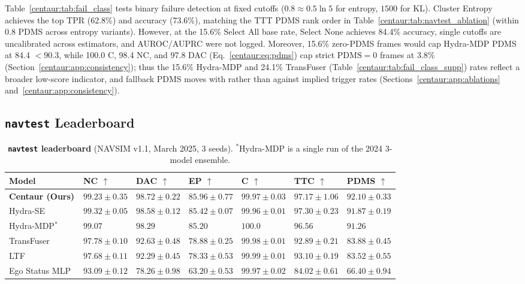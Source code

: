 Table~\ref{centaur:tab:fail_class} tests binary failure detection at fixed cutoffs ($0.8 \approx 0.5\ln 5$ for entropy, $1500$ for KL). Cluster Entropy achieves the top TPR (62.8\%) and accuracy (73.6\%), matching the TTT PDMS rank order in Table~\ref{centaur:tab:navtest_ablation} (within 0.8 PDMS across entropy variants). However, at the 15.6\% Select All base rate, Select None achieves 84.4\% accuracy, single cutoffs are uncalibrated across estimators, and AUROC/AUPRC were not logged. Moreover, 15.6\% zero-PDMS frames would cap Hydra-MDP PDMS at 84.4 $< 90.3$, while 100.0 C, 98.4 NC, and 97.8 DAC (Eq.~\eqref{centaur:eq:pdms}) cap strict $\text{PDMS}=0$ frames at 3.8\% (Section~\ref{centaur:app:consistency}); thus the 15.6\% Hydra-MDP and 24.1\% TransFuser (Table~\ref{centaur:tab:fail_class_supp}) rates reflect a broader low-score indicator, and fallback PDMS moves with rather than against implied trigger rates (Sections~\ref{centaur:app:ablations} and~\ref{centaur:app:consistency}).

\subsection{\texorpdfstring{\texttt{navtest}}{navtest} Leaderboard}\label{centaur:sec:leaderboard}

\begin{table}[t]
  \centering
  \caption[\texttt{navtest} leaderboard]{\textbf{\texttt{navtest} leaderboard} (NAVSIM v1.1, March 2025, 3 seeds). $^{\ast}$Hydra-MDP is a single run of the 2024 3-model ensemble.}
  \label{centaur:tab:navtest_all}
  \begin{adjustbox}{max width=\textwidth}
  \begin{tabular}{l|llll|ll}
    \toprule
    \textbf{Model} & \textbf{NC} $\uparrow$ & \textbf{DAC} $\uparrow$ & \textbf{EP} $\uparrow$ & \textbf{C} $\uparrow$ & \textbf{TTC} $\uparrow$ & \textbf{PDMS} $\uparrow$ \\
    \midrule
    \textbf{Centaur (Ours)} & $99.23\pm0.35$ & $\mathbf{98.72\pm0.22}$ & $\mathbf{85.96\pm0.77}$ & $99.97\pm0.03$ & $97.17\pm1.06$ & $\mathbf{92.10\pm0.33}$ \\
    Hydra-SE & $\mathbf{99.32\pm0.05}$ & $98.58\pm0.12$ & $85.42\pm0.07$ & $99.96\pm0.01$ & $\mathbf{97.30\pm0.23}$ & $91.87\pm0.19$ \\
    \midrule
    Hydra-MDP$^{\ast}$~\cite{li2024hydramdp} & $99.07$ & $98.29$ & $85.20$ & $\mathbf{100.0}$ & $96.56$ & $91.26$ \\
    TransFuser~\cite{chitta2023transfuser} & $97.78\pm0.10$ & $92.63\pm0.48$ & $78.88\pm0.25$ & $99.98\pm0.01$ & $92.89\pm0.21$ & $83.88\pm0.45$ \\
    LTF~\cite{chitta2023transfuser} & $97.68\pm0.11$ & $92.29\pm0.45$ & $78.33\pm0.53$ & $99.99\pm0.01$ & $93.10\pm0.19$ & $83.52\pm0.55$ \\
    Ego Status MLP~\cite{dauner2024navsim} & $93.09\pm0.12$ & $78.26\pm0.98$ & $63.20\pm0.53$ & $99.97\pm0.02$ & $84.02\pm0.61$ & $66.40\pm0.94$ \\
    \bottomrule
  \end{tabular}
  \end{adjustbox}
\end{table}

